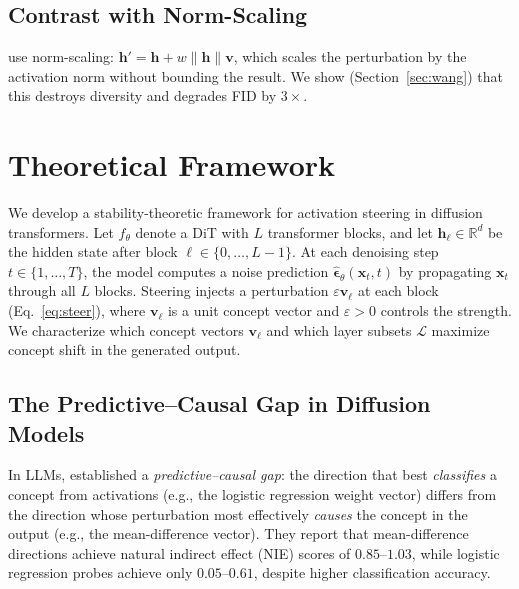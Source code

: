 \documentclass{article}
\theoremstyle{definition}
\newcommand{\R}{\mathbb{R}}
\newcommand{\bx}{\mathbf{x}}
\newcommand{\bv}{\mathbf{v}}
\newcommand{\bh}{\mathbf{h}}
\begin{document}
\subsection{Contrast with Norm-Scaling}

\citet{wang2026general} use norm-scaling: $\bh' = \bh + w \|\bh\| \bv$, which scales the perturbation by the activation norm without bounding the result.
We show (Section~\ref{sec:wang}) that this destroys diversity and degrades FID by $3\times$.

\section{Theoretical Framework}
\label{sec:theory}

We develop a stability-theoretic framework for activation steering in diffusion transformers.
Let $f_\theta$ denote a DiT with $L$ transformer blocks, and let $\bh_\ell \in \R^d$ be the hidden state after block $\ell \in \{0, \ldots, L-1\}$.
At each denoising step $t \in \{1, \ldots, T\}$, the model computes a noise prediction $\hat{\boldsymbol{\epsilon}}_\theta(\bx_t, t)$ by propagating $\bx_t$ through all $L$ blocks.
Steering injects a perturbation $\varepsilon \bv_\ell$ at each block (Eq.~\ref{eq:steer}), where $\bv_\ell$ is a unit concept vector and $\varepsilon > 0$ controls the strength.
We characterize which concept vectors $\bv_\ell$ and which layer subsets $\mathcal{L}$ maximize concept shift in the generated output.

\subsection{The Predictive--Causal Gap in Diffusion Models}

In LLMs, \citet{marks2024geometry} established a \emph{predictive--causal gap}: the direction that best \emph{classifies} a concept from activations (e.g., the logistic regression weight vector) differs from the direction whose perturbation most effectively \emph{causes} the concept in the output (e.g., the mean-difference vector).
They report that mean-difference directions achieve natural indirect effect (NIE) scores of $0.85$--$1.03$, while logistic regression probes achieve only $0.05$--$0.61$, despite higher classification accuracy.
\end{document}
